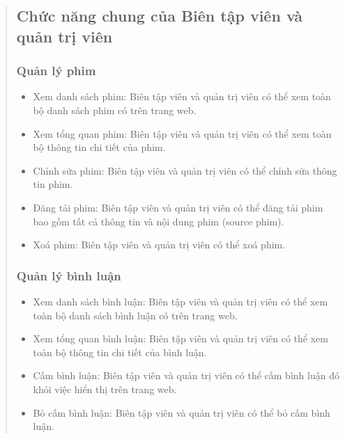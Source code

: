 \begin{quote}
\subsection{Chức năng chung của Biên tập viên và quản trị viên} 

\subsubsection{Quản lý phim}
\begin{itemize}
    \item Xem danh sách phim: Biên tập viên và quản trị viên có thể xem toàn bộ danh sách phim có trên trang web.
    \item Xem tổng quan phim: Biên tập viên và quản trị viên có thể xem toàn bộ thông tin chi tiết của phim.
    \item Chỉnh sửa phim: Biên tập viên và quản trị viên có thể chỉnh sửa thông tin phim.
    \item Đăng tải phim: Biên tập viên và quản trị viên có thể đăng tải phim bao gồm tất cả thông tin và nội dung phim (source phim).
    \item Xoá phim: Biên tập viên và quản trị viên có thể xoá phim.
\end{itemize}

\subsubsection{Quản lý bình luận}
\begin{itemize}
    \item Xem danh sách bình luận: Biên tập viên và quản trị viên có thể xem toàn bộ danh sách bình luận có trên trang web.
    \item Xem tổng quan bình luận: Biên tập viên và quản trị viên có thể xem toàn bộ thông tin chi tiết của bình luận.
    \item Cấm bình luận: Biên tập viên và quản trị viên có thể cấm bình luận đó khỏi việc hiển thị trên trang web.
    \item Bỏ cấm bình luận: Biên tập viên và quản trị viên có thể bỏ cấm bình luận.
\end{itemize}
    
\end{quote}



